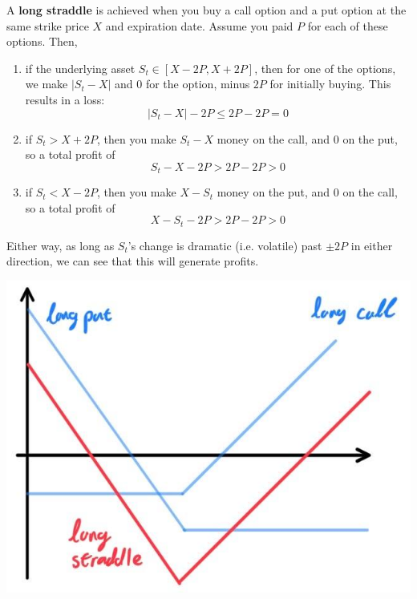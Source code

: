\documentclass{article}
\begin{document}
  \begin{definition}
    A \textbf{long straddle} is achieved when you buy a call option and a put option at the same strike price $X$ and expiration date. Assume you paid $P$ for each of these options. Then, 
    \begin{enumerate}
      \item if the underlying asset $S_t \in [X - 2P, X + 2P]$, then for one of the options, we make $|S_t - X|$ and $0$ for the option, minus $2P$ for initially buying. This results in a loss: 
      \[|S_t - X| - 2P \leq 2P - 2P = 0 \]
      \item if $S_t > X + 2P$, then you make $S_t - X$ money on the call, and $0$ on the put, so a total profit of 
      \[S_t - X - 2P > 2P - 2P > 0\]
      
      \item if $S_t < X - 2P$, then you make $X - S_t$ money on the put, and $0$ on the call, so a total profit of 
      \[X - S_t - 2P > 2P - 2P > 0\]
    \end{enumerate}
    Either way, as long as $S_t$'s change is dramatic (i.e. volatile) past $\pm 2P$ in either direction, we can see that this will generate profits. 
    \begin{center}
      \includegraphics[scale=0.3]{img/long_straddle.jpg}
    \end{center}
  \end{definition}
\end{document}
